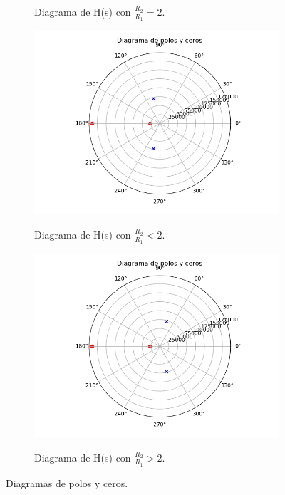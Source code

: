 \begin{figure}[H]
\begin{subfigure}{.45\textwidth}
	\label{fig:poleZeroDiagHs1}
	\caption{Diagrama de H(s) con $\frac{R_2}{R_1}=2$.}
\end{subfigure}
\begin{subfigure}{.45\textwidth}
\centering
	\includegraphics[width=\textwidth]{Imagenes-Ej1/Hrmin1.png}
	\label{fig:poleZeroDiagHsmin}
	\caption{Diagrama de H(s) con $\frac{R_2}{R_1}<2$.}
\end{subfigure}
\begin{subfigure}{.45\textwidth}
\centering
	\includegraphics[width=\textwidth]{Imagenes-Ej1/Hrmn1.png}
	\label{fig:poleZeroDiagHsmax}
	\caption{Diagrama de H(s) con $\frac{R_2}{R_1}>2$.}
\end{subfigure}
\caption{Diagramas de polos y ceros.}
\label{fig:poleZeroDiag}
\end{figure}

